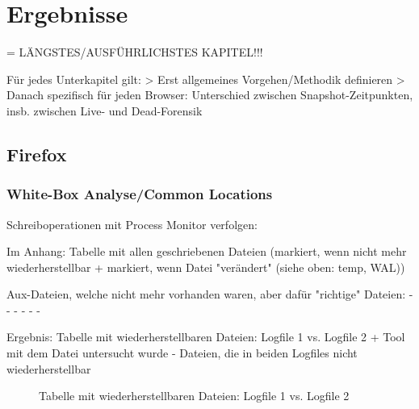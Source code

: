 \chapter{Ergebnisse}

= LÄNGSTES/AUSFÜHRLICHSTES KAPITEL!!!

Für jedes Unterkapitel gilt: 
> Erst allgemeines Vorgehen/Methodik definieren
> Danach spezifisch für jeden Browser: Unterschied zwischen Snapshot-Zeitpunkten, insb. zwischen Live- und Dead-Forensik

\section{Firefox}

\subsection*{White-Box Analyse/Common Locations}

Schreiboperationen mit Process Monitor verfolgen:

Im Anhang: Tabelle mit allen geschriebenen Dateien (markiert, wenn nicht mehr wiederherstellbar + markiert, wenn Datei "verändert" (siehe oben: temp, WAL))

Aux-Dateien, welche nicht mehr vorhanden waren, aber dafür "richtige" Dateien:
	- %
	- %
	- %
	- %
	- %
	- %

Ergebnis: Tabelle mit wiederherstellbaren Dateien: Logfile 1 vs. Logfile 2 + Tool mit dem Datei untersucht wurde
- Dateien, die in beiden Logfiles nicht wiederherstellbar 
\begin{figure}[h!]
	\caption{Tabelle mit wiederherstellbaren Dateien: Logfile 1 vs. Logfile 2}
\end{figure}

